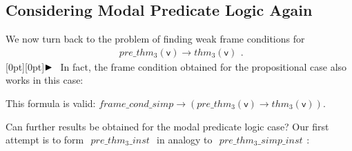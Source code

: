 \documentclass[a4paper]{article}
\newcommand{\imp}{\rightarrow}
\newcommand{\pplmacro}[1]{\mathit{#1}}
\newcommand{\pplIsValid}[1]{\noindent This formula is valid: $#1$\par}
\newcommand{\highlightpar}{\noindent\raisebox{0.2ex}[0pt][0pt]{$\blacktriangleright\hspace{0.8em}$}}
\begin{document}
%
%

  \subsection{Considering Modal Predicate Logic Again}

  We now turn back to the problem of finding weak frame conditions for
  \[\begin{array}{l}
\pplmacro{pre\_thm_{3}}(\mathsf{v}) \imp  \pplmacro{thm_{3}}(\mathsf{v})
\end{array}
.\]
  \highlightpar In fact, the frame condition obtained for the propositional
  case also works in this case:

  \smallskip
\pplIsValid{\pplmacro{frame\_cond\_simp} \imp  (\pplmacro{pre\_thm_{3}}(\mathsf{v}) \imp  \pplmacro{thm_{3}}(\mathsf{v})).}
%
%

  \medskip \noindent Can further results be obtained for the modal predicate
  logic case?  Our first attempt is to form $\begin{array}{l}
\pplmacro{pre\_thm_{3}\_inst}
\end{array}
$ in
  analogy to $\begin{array}{l}
\pplmacro{pre\_thm_{3}\_simp\_inst}
\end{array}
$:
\end{document}
